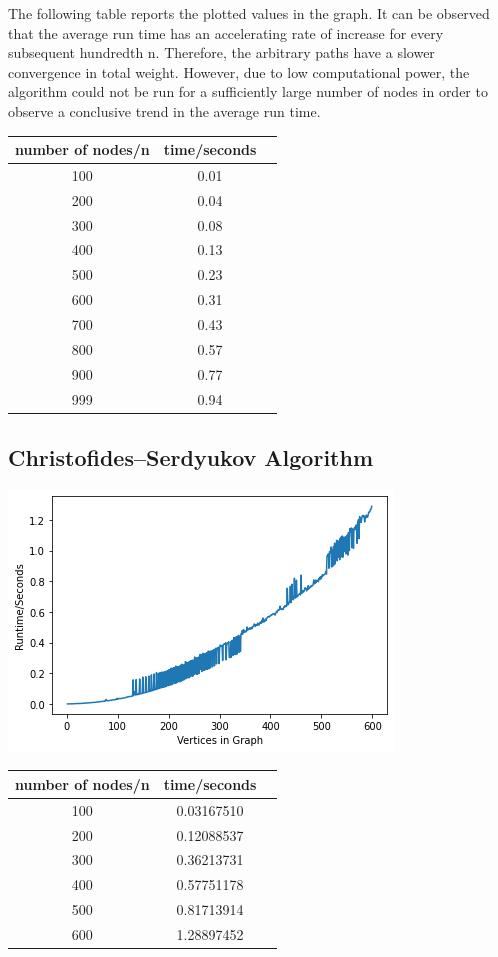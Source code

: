 \documentclass[12pt]{report}
\begin{document}
The following table reports the plotted values in the graph. It can be observed that the average run time has an accelerating rate of increase for every subsequent hundredth n. Therefore, the arbitrary paths have a slower convergence in total weight. However, due to low computational power, the algorithm could not be run for a sufficiently large number of nodes in order to observe a conclusive trend in the average run time.

\begin{center}
\begin{tabular}{ |c|c|c| } 
 \hline
 number of nodes/n & time/seconds \\ 
 \hline
 100 & 0.01  \\ 
 \hline
 200 & 0.04 \\ 
 \hline
 300 & 0.08 \\ 
 \hline
 400 & 0.13  \\ 
 \hline
 500 & 0.23 \\ 
 \hline
 600 & 0.31 \\ 
 \hline
 700 & 0.43  \\ 
 \hline
 800 & 0.57 \\ 
 \hline
 900 & 0.77 \\ 
 \hline
 999 & 0.94  \\ 
 \hline
\end{tabular}
\end{center}
     
\subsection {Christofides–Serdyukov Algorithm}

\begin{center}
    \includegraphics[scale = 0.75]{images/christ600.png}
\end{center}
\begin{center}
\begin{tabular}{ |c|c|c| } 
 \hline
 number of nodes/n & time/seconds \\ 
 \hline
 100 & 0.03167510 \\ 
 \hline
 200 & 0.12088537 \\ 
 \hline
 300 & 0.36213731 \\ 
 \hline
 400 & 0.57751178  \\ 
 \hline
 500 & 0.81713914 \\ 
 \hline
 600 & 1.28897452 \\ 
 \hline
\end{tabular}
\end{center}
\end{document}
